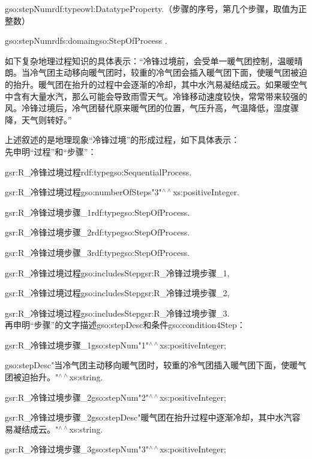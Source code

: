 gso:stepNum\quad rdf:type\quad owl:DatatypeProperty\quad .\quad （步骤的序号，第几个步骤，取值为正整数）

gso:stepNum\quad rdfs:domain\quad gso:StepOfProcess .

如下复杂地理过程知识的具体表示：“冷锋过境前，会受单一暖气团控制，温暖晴朗。当冷气团主动移向暖气团时，较重的冷气团会插入暖气团下面，使暖气团被迫的抬升。暖气团在抬升的过程中会逐渐的冷却，其中水汽易凝结成云。如果暖空气中含有大量水汽，那么可能会导致雨雪天气。冷锋移动速度较快，常常带来较强的风。冷锋过境后，冷气团替代原来暖气团的位置，气压升高，气温降低，湿度骤降，天气则转好。”

上述叙述的是地理现象“冷锋过境”的形成过程，如下具体表示：\\
先申明“过程”和“步骤”：

gsr:R\_冷锋过境过程\quad rdf:type\quad \quad gso:SequentialProcess\quad .

gsr:R\_冷锋过境过程\quad gso:numberOfSteps\quad "3"$^{\land\land}$xs:positiveInteger\quad .

gsr:R\_冷锋过境步骤\_1\quad rdf:type\quad \quad gso:StepOfProcess\quad .

gsr:R\_冷锋过境步骤\_2\quad rdf:type\quad \quad gso:StepOfProcess\quad .

gsr:R\_冷锋过境步骤\_3\quad rdf:type\quad \quad gso:StepOfProcess\quad .

gsr:R\_冷锋过境过程\quad gso:includesStep\quad gsr:R\_冷锋过境步骤\_1\quad ,\quad 

gsr:R\_冷锋过境过程\quad gso:includesStep\quad gsr:R\_冷锋过境步骤\_2\quad ,\quad 

gsr:R\_冷锋过境过程\quad gso:includesStep\quad gsr:R\_冷锋过境步骤\_3\quad .
\\
再申明“步骤”的文字描述gso:stepDesc和条件gso:condition4Step：

gsr:R\_冷锋过境步骤\_1\quad gso:stepNum\quad "1"$^{\land\land}$xs:positiveInteger\quad ;

gso:stepDesc\quad "当冷气团主动移向暖气团时，较重的冷气团插入暖气团下面，使暖气团被迫抬升。"$^{\land\land}$xs:string\quad .

gsr:R\_冷锋过境步骤\_2\quad gso:stepNum\quad "2"$^{\land\land}$xs:positiveInteger\quad ;

gsr:R\_冷锋过境步骤\_2\quad gso:stepDesc\quad "暖气团在抬升过程中逐渐冷却，其中水汽容易凝结成云。"$^{\land\land}$xs:string\quad .

gsr:R\_冷锋过境步骤\_3\quad gso:stepNum\quad "3"$^{\land\land}$xs:positiveInteger\quad ;

